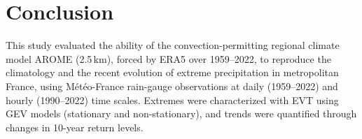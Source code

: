 \documentclass[french,a4paper,DIV=11,numbers=noendperiod]{scrartcl}
\begin{document}





\section{Conclusion}\label{conclusion}

This study evaluated the ability of the convection-permitting regional climate model AROME (2.5\,km), forced by ERA5 over 1959--2022, to reproduce the climatology and the recent evolution of extreme precipitation in metropolitan France, using Météo-France rain-gauge observations at daily (1959--2022) and hourly (1990--2022) time scales. Extremes were characterized with EVT using GEV models (stationary and non-stationary), and trends were quantified through changes in 10-year return levels.

\end{document}
